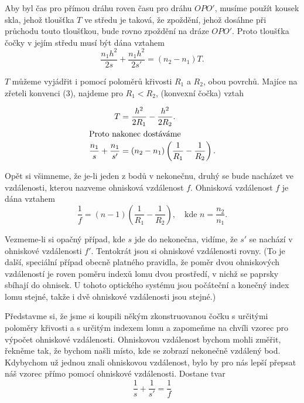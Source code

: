     Aby byl čas pro přímou dráhu roven času pro dráhu \(OPO'\), musíme použít kousek skla, jehož 
    tloušťka \(T\) ve středu je taková, že zpoždění, jehož dosáhne při průchodu touto tloušťkou, 
    bude rovno zpoždění na dráze \(OPO'\). Proto tloušťka čočky v jejím středu musí být dána vztahem
    \begin{equation}  \label{fyz:eq366}
      \frac{n_1h^2}{2s} + \frac{n_1h^2}{2s'} = (n_2 - n_1)T.
    \end{equation}
    
    \(T\) můžeme vyjádřit i pomocí poloměrů křivosti \(R_1\) a \(R_2\), obou povrchů. Majíce na 
    zřeteli konvenci (3), najdeme pro \(R_1<R_2\), (konvexní čočka) vztah
      
    \begin{subequations}\label{fyz:eq367}
      \begin{align}
       T  &= \frac{h^2}{2R_1} - \frac{h^2}{2R_2}.                        \label{fyz:eq367a} \\
        \shortintertext{Proto nakonec dostáváme}
       \frac{n_1}{s} + \frac{n_1}{s'} 
          &= (n_2 - n_1)\left(\frac{1}{R_1} - \frac{1}{R_2}\right).      \label{fyz:eq367b}
      \end{align}    
    \end{subequations}
    
    Opět si všimneme, že je-li jeden z bodů v nekonečnu, druhý se bude nacházet ve vzdálenosti, 
    kterou nazveme ohnisková vzdálenost \(f\). Ohnisková vzdálenost \(f\) je dána vztahem
    \begin{equation}  \label{fyz:eq368}
      \frac{1}{f} = (n - 1)\left(\frac{1}{R_1} - \frac{1}{R_2}\right), \quad\text{kde }
      n = \frac{n_2}{n_1}.
    \end{equation}
    
    Vezmeme-li si opačný případ, kde \(s\) jde do nekonečna, vidíme, že \(s'\) se nachází v 
    ohniskové vzdálenosti \(f'\). Tentokrát jsou si ohniskové vzdálenosti rovny. (To je další, 
    speciální případ obecně platného pravidla, že poměr dvou ohniskových vzdáleností je roven 
    poměru indexů lomu dvou prostředí, v nichž se paprsky sbíhají do ohnisek. U tohoto optického 
    systému jsou počáteční a konečný index lomu stejné, takže i dvě ohniskové vzdálenosti jsou 
    stejné.)
    
    Představme si, že jsme si koupili někým zkonstruovanou čočku s určitými poloměry křivosti a s 
    určitým indexem lomu a zapomeňme na chvíli vzorec pro výpočet ohniskové vzdálenosti. Ohniskovou 
    vzdálenost bychom mohli změřit, řekněme tak, že bychom našli místo, kde se zobrazí nekonečně 
    vzdálený bod. Kdybychom už jednou znali ohniskovou vzdálenost, bylo by pro nás lepší přepsat 
    náš vzorec přímo pomocí ohniskové vzdálenosti. Dostane tvar 
    \begin{equation}  \label{fyz:eq369}
      \frac{1}{s} + \frac{1}{s'} = \frac{1}{f}
    \end{equation}
    
